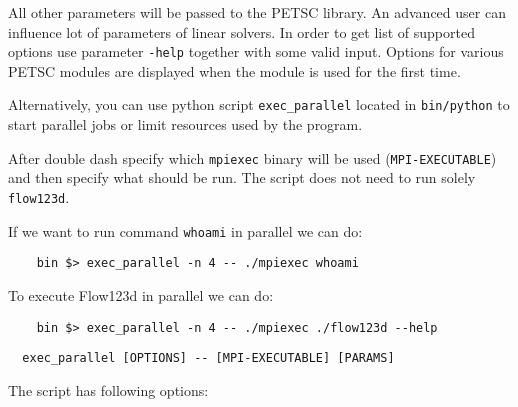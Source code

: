 All other parameters will be passed to the PETSC library. An advanced user can influence lot of parameters of linear solvers. In order to get list of supported options
use parameter \verb'-help' together with some valid input. Options for various PETSC modules are displayed when the module is used for the first time.

Alternatively, you can use python script \verb'exec_parallel' located in \verb'bin/python' to start parallel jobs or limit resources used by the program.

After double dash specify which \verb'mpiexec' binary will be used (\verb'MPI-EXECUTABLE') and then specify what should be run.
The script does not need to run solely \verb'flow123d'.

If we want to run command \verb'whoami' in parallel we can do:
\begin{verbatim}
	bin $> exec_parallel -n 4 -- ./mpiexec whoami
\end{verbatim}

To execute Flow123d in parallel we can do:
\begin{verbatim}
	bin $> exec_parallel -n 4 -- ./mpiexec ./flow123d --help
\end{verbatim}


\begin{verbatim}
  exec_parallel [OPTIONS] -- [MPI-EXECUTABLE] [PARAMS]
\end{verbatim}

The script has following options:

